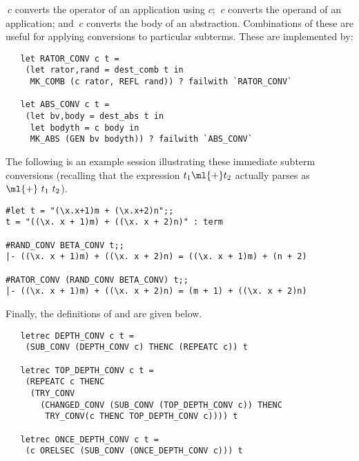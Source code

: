 \noindent {}$\ c$ converts the operator of an application using
$c$; $\ c$ converts the operand of an application; and
$\ c$ converts the body of an abstraction. Combinations
of these are useful for applying conversions to particular subterms.
These are implemented by:

\begin{hol}\begin{verbatim}
   let RATOR_CONV c t =
    (let rator,rand = dest_comb t in
     MK_COMB (c rator, REFL rand)) ? failwith `RATOR_CONV`

   let ABS_CONV c t =
    (let bv,body = dest_abs t in
     let bodyth = c body in
     MK_ABS (GEN bv bodyth)) ? failwith `ABS_CONV`
\end{verbatim}\end{hol}

\noindent The following
is an example session illustrating these immediate subterm conversions
(recalling that the expression $t_1\ml{+}t_2$
actually parses as $\ml{+}\ t_1\ t_2$).

\setcounter{sessioncount}{1}
\begin{session}\begin{verbatim}
#let t = "(\x.x+1)m + (\x.x+2)n";;
t = "((\x. x + 1)m) + ((\x. x + 2)n)" : term

#RAND_CONV BETA_CONV t;;
|- ((\x. x + 1)m) + ((\x. x + 2)n) = ((\x. x + 1)m) + (n + 2)

#RATOR_CONV (RAND_CONV BETA_CONV) t;;
|- ((\x. x + 1)m) + ((\x. x + 2)n) = (m + 1) + ((\x. x + 2)n)
\end{verbatim}\end{session}

\noindent Finally, the definitions of  and
 are given below.


\begin{hol}
\begin{verbatim}
   letrec DEPTH_CONV c t =
    (SUB_CONV (DEPTH_CONV c) THENC (REPEATC c)) t

   letrec TOP_DEPTH_CONV c t =
    (REPEATC c THENC
     (TRY_CONV
       (CHANGED_CONV (SUB_CONV (TOP_DEPTH_CONV c)) THENC
        TRY_CONV(c THENC TOP_DEPTH_CONV c)))) t

   letrec ONCE_DEPTH_CONV c t =
    (c ORELSEC (SUB_CONV (ONCE_DEPTH_CONV c))) t
\end{verbatim}\end{hol}

